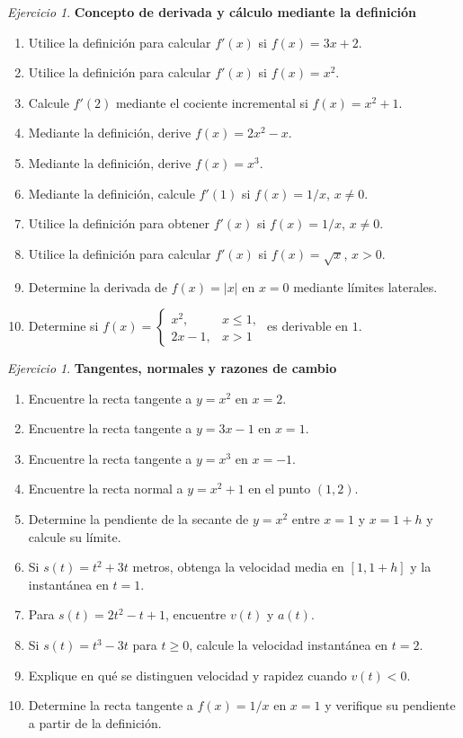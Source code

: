 \documentclass[12pt]{article}
\theoremstyle{remark}
\newtheorem{Ejer}[definicion]{Ejercicio}
\begin{document}
\begin{Ejer}\textbf{Concepto de derivada y cálculo mediante la definición}
\begin{enumerate}[series=banco]
\item Utilice la definición para calcular $f'(x)$ si $f(x)=3x+2$.
\item Utilice la definición para calcular $f'(x)$ si $f(x)=x^2$.
\item Calcule $f'(2)$ mediante el cociente incremental si $f(x)=x^2+1$.
\item Mediante la definición, derive $f(x)=2x^2-x$.
\item Mediante la definición, derive $f(x)=x^3$.
\item Mediante la definición, calcule $f'(1)$ si $f(x)=1/x$, $x\ne0$.
\item Utilice la definición para obtener $f'(x)$ si $f(x)=1/x$, $x\ne0$.
\item Utilice la definición para calcular $f'(x)$ si $f(x)=\sqrt{x}$, $x>0$.
\item Determine la derivada de $f(x)=|x|$ en $x=0$ mediante límites laterales.
\item Determine si $f(x)=\begin{cases}x^2,&x\le1,\\2x-1,&x>1\end{cases}$ es derivable en $1$.
\end{enumerate}
\end{Ejer}

\begin{Ejer}\textbf{Tangentes, normales y razones de cambio}
\begin{enumerate}[resume=banco]
\item Encuentre la recta tangente a $y=x^2$ en $x=2$.
\item Encuentre la recta tangente a $y=3x-1$ en $x=1$.
\item Encuentre la recta tangente a $y=x^3$ en $x=-1$.
\item Encuentre la recta normal a $y=x^2+1$ en el punto $(1,2)$.
\item Determine la pendiente de la secante de $y=x^2$ entre $x=1$ y $x=1+h$ y calcule su límite.
\item Si $s(t)=t^2+3t$ metros, obtenga la velocidad media en $[1,1+h]$ y la instantánea en $t=1$.
\item Para $s(t)=2t^2-t+1$, encuentre $v(t)$ y $a(t)$.
\item Si $s(t)=t^3-3t$ para $t\ge0$, calcule la velocidad instantánea en $t=2$.
\item Explique en qué se distinguen velocidad y rapidez cuando $v(t)<0$.
\item Determine la recta tangente a $f(x)=1/x$ en $x=1$ y verifique su pendiente a partir de la definición.
\end{enumerate}
\end{Ejer}
\end{document}
